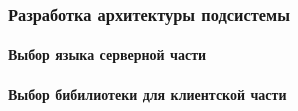 \clearpage
\subsubsection{Разработка архитектуры подсистемы} \hfill
\paragraph{Выбор языка серверной части}

\paragraph{Выбор бибилиотеки для клиентской части}
